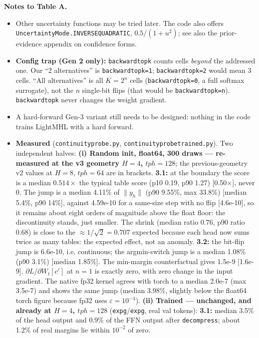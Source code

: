 \documentclass[10pt]{article}
\newcommand{\code}[1]{{\renewcommand{\_}{\textunderscore\allowbreak}\texttt{#1}}}
\newcommand{\note}[1]{\textsuperscript{\textbf{#1}}}
\begin{document}
\normalsize
\noindent\textbf{Notes to Table A.}
\begin{itemize}\setlength\itemsep{0pt}\footnotesize
\item[\note{a}] Other uncertainty functions may be tried later. The code also offers \code{UncertaintyMode.INVERSE\_QUADRATIC}, $0.5/(1+u^2)$; see also the prior-evidence appendix on confidence forms.
\item[\note{b}] \textbf{Config trap (Gen 2 only):} \code{backward\_topk} counts cells \emph{beyond} the addressed one. Our ``2 alternatives'' is
  \code{backward\_topk=1}; \code{backward\_topk=2} would mean 3 cells. ``All alternatives'' is all $K=2^n$ cells (\code{backward\_topk=0}, a full softmax surrogate),
  not the $n$ single-bit flips (that would be \code{backward\_topk=n}). \code{backward\_topk} never changes the weight gradient.
\item[\note{c}] A hard-forward Gen-3 variant still needs to be designed: nothing in the code trains LightMHL with a hard forward.
\item[\note{d}] \textbf{Measured} (\code{continuity\_probe.py}, \code{continuity\_probe\_trained.py}). Two independent halves:
  \textbf{(i) Random init, float64, 300 draws --- re-measured at the v3 geometry $H=4$, $tph=128$}; the previous-geometry v2 values at $H=8$, $tph=64$ are in brackets.
  \textbf{3.1:} at the boundary the score is a median $0.514\times$ the typical table score (p10 0.19, p90 1.27) [0.50$\times$], never 0.
  The jump is a median 4.11\% of $\|y_h\|$ (p90 9.55\%, max 33.8\%) [median 5.4\%, p90 14\%], against 4.59e-10 for a same-size step with no flip [4.6e-10],
  so it remains about eight orders of magnitude above the float floor: the discontinuity stands, just smaller.
  The shrink (median ratio 0.76, p90 ratio 0.68) is close to the $\approx1/\sqrt2=0.707$ expected because each head now sums twice as many tables: the expected effect, not an anomaly.
  \textbf{3.2:} the bit-flip jump is 6.6e-10, i.e. continuous; the argmin-switch jump is a median 1.08\% (p90 3.1\%) [median 1.85\%].
  The min-margin counterfactual gives 1.5e-9 [1.6e-9]. $\partial L/\partial W_t[c']$ at $n=1$ is exactly zero, with zero change in the input gradient.
  The native fp32 kernel agrees with torch to a median 2.0e-7 (max 3.5e-7) and shows the same jump (median 3.98\%, slightly below the float64 torch figure because fp32 uses $\varepsilon=10^{-4}$).
  \textbf{(ii) Trained --- unchanged, and already at $H=4$, $tph=128$} (\code{exp\_g\_0193}/\code{exp\_g\_0194}, real val tokens):
  \textbf{3.1:} median 3.5\% of the head output and 0.9\% of the FFN output after \code{decompress}; about 1.2\% of real margins lie within $10^{-2}$ of zero.

\end{itemize}
\end{document}
